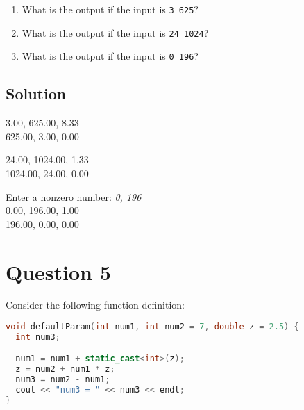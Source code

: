 \documentclass[a4paper, 11pt]{article}
\begin{document}
    \begin{enumerate}[label=\Alph*.]
      \item What is the output if the input is \texttt{3 625}?
      \item What is the output if the input is \texttt{24 1024}?
      \item What is the output if the input is \texttt{0 196}?
    \end{enumerate}

    \subsection{Solution}
    \begin{enumerate}[label=\alph*.]
      \begin{minipage}{0.45\textwidth}
        \item \begin{mdframed}[style=AnswerFrame]
          3.00, 625.00, 8.33\\
          625.00, 3.00, 0.00
          \end{mdframed}
        \item \begin{mdframed}[style=AnswerFrame]
          24.00, 1024.00, 1.33\\
          1024.00, 24.00, 0.00
          \end{mdframed}
      \end{minipage}\hfill
      \begin{minipage}{.45\textwidth}
        \item \begin{mdframed}[style=AnswerFrame]
          Enter a nonzero number: \textit{0, 196}\\

          0.00, 196.00, 1.00\\
          196.00, 0.00, 0.00
          \end{mdframed}
      \end{minipage}
    \end{enumerate}


  \newpage
  \section{Question 5}
    Consider the following function definition:

    \begin{lstlisting}[language=c++,caption={Question 5 Problem}]
void defaultParam(int num1, int num2 = 7, double z = 2.5) {
  int num3;

  num1 = num1 + static_cast<int>(z);
  z = num2 + num1 * z;
  num3 = num2 - num1;
  cout << "num3 = " << num3 << endl;
}
    \end{lstlisting}
\end{document}

